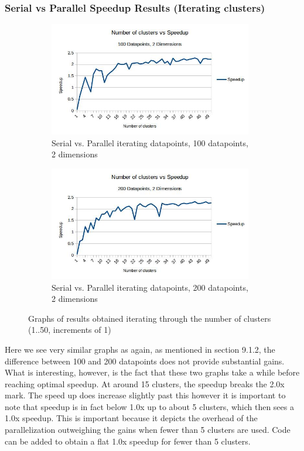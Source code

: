 \documentclass{article}
\begin{document}
\newpage
\subsubsection{Serial vs Parallel Speedup Results (Iterating clusters)}
\begin{figure}[h!]
    \begin{subfigure}{0.5\textwidth}
        \includegraphics[width=0.9\linewidth, height=5cm]{Pictures/clusters1_Speedup.jpg}
        \caption{Serial vs. Parallel iterating datapoints, 100 datapoints, 2 dimensions}
    \end{subfigure}
    \begin{subfigure}{0.5\textwidth}
        \includegraphics[width=0.9\linewidth, height=5cm]{Pictures/clusters2_Speedup.jpg}
        \caption{Serial vs. Parallel iterating datapoints, 200 datapoints, 2 dimensions}
    \end{subfigure}
\caption{Graphs of results obtained iterating through the number of clusters (1..50, increments of 1)}
\end{figure}

Here we see very similar graphs as again, as mentioned in section 9.1.2, the difference between 100 and 200 datapoints does not provide substantial gains. What is interesting, however, is the fact that these two graphs take a while before reaching optimal speedup. At around 15 clusters, the speedup breaks the 2.0x mark. The speed up does increase slightly past this however it is important to note that speedup is in fact below 1.0x up to about 5 clusters, which then sees a 1.0x speedup. This is important because it depicts the overhead of the parallelization outweighing the gains when fewer than 5 clusters are used. Code can be added to obtain a flat 1.0x speedup for fewer than 5 clusters.
\end{document}
